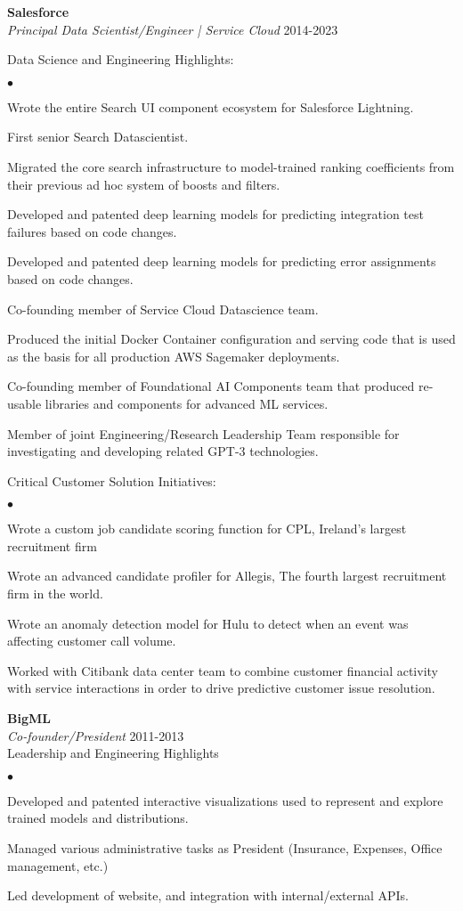 \documentclass[margin,line]{res}
\newenvironment{list2}{
  \begin{list}{$\bullet$}{%
      \setlength{\itemsep}{0in}
      \setlength{\parsep}{0in} \setlength{\parskip}{0in}
      \setlength{\topsep}{0in} \setlength{\partopsep}{0in} 
      \setlength{\leftmargin}{0.2in}}}{\end{list}}
\begin{document}
\begin{resume}
{\bf Salesforce} \\
{\em Principal Data Scientist/Engineer | Service Cloud} \hfill 2014-2023

Data Science and Engineering Highlights:
\begin{list2}
  \item Wrote the entire Search UI component ecosystem for Salesforce Lightning.
  \item First senior Search Datascientist.
  \item Migrated the core search infrastructure to model-trained ranking coefficients from their previous ad hoc system of boosts and filters.
  \item Developed and patented deep learning models for predicting integration test failures based on code changes.
  \item Developed and patented deep learning models for predicting error assignments based on code changes.
  \item Co-founding member of Service Cloud Datascience team.
  \item Produced the initial Docker Container configuration and serving code that is used as the basis for all production AWS Sagemaker deployments.
  \item Co-founding member of Foundational AI Components team that produced re-usable libraries and components for advanced ML services.
  \item Member of joint Engineering/Research Leadership Team responsible for investigating and developing related GPT-3 technologies.
\end{list2}

Critical Customer Solution Initiatives:
  \begin{list2}
  \item Wrote a custom job candidate scoring function for CPL, Ireland’s largest recruitment firm
  \item Wrote an advanced candidate profiler for Allegis, The fourth largest recruitment firm in the world.
  \item Wrote an anomaly detection model for Hulu to detect when an event was affecting customer call volume.
  \item Worked with Citibank data center team to combine customer financial activity with service interactions in order to drive predictive customer issue resolution.
\end{list2}

{\bf BigML} \\
{\em Co-founder/President} \hfill 2011-2013\\
Leadership and Engineering Highlights
\begin{list2}
  \item Developed and patented interactive visualizations used to represent and explore trained models and distributions.
  \item Managed various administrative tasks as President (Insurance, Expenses, Office management, etc.)
  \item Led development of website, and integration with internal/external APIs.
\end{list2}



\end{resume}
\end{document}
